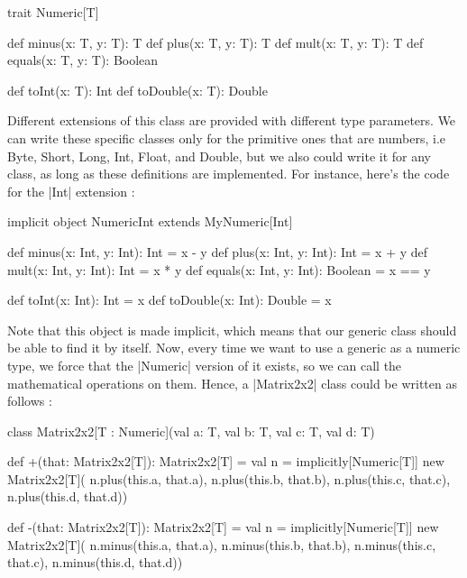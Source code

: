 \begin{lstlisting-nobreak}
 trait Numeric[T] {
   def minus(x: T, y: T): T
   def plus(x: T, y: T): T
   def mult(x: T, y: T): T
   def equals(x: T, y: T): Boolean

   def toInt(x: T): Int
   def toDouble(x: T): Double
 }
\end{lstlisting-nobreak}

Different extensions of this class are provided with different type parameters. We can write these specific classes only for the primitive ones that are numbers, i.e Byte, Short, Long, Int, Float, and Double, but we also could write it for any class, as long as these definitions are implemented. For instance, here's the code for the |Int| extension :

\begin{lstlisting-nobreak}
 implicit object NumericInt extends MyNumeric[Int] {
   def minus(x: Int, y: Int): Int = x - y
   def plus(x: Int, y: Int): Int = x + y
   def mult(x: Int, y: Int): Int = x * y
   def equals(x: Int, y: Int): Boolean = x == y

   def toInt(x: Int): Int = x
   def toDouble(x: Int): Double = x
 }
\end{lstlisting-nobreak}

Note that this object is made implicit, which means that our generic class should be able to find it by itself. Now, every time we want to use a generic as a numeric type, we force that the |Numeric| version of it exists, so we can call the mathematical operations on them. Hence, a |Matrix2x2| class could be written as follows :

\begin{lstlisting-nobreak}
 class Matrix2x2[T : Numeric](val a: T, val b: T, val c: T, val d: T) {

   def +(that: Matrix2x2[T]): Matrix2x2[T] = {
     val n = implicitly[Numeric[T]]
     new Matrix2x2[T](
       n.plus(this.a, that.a),
       n.plus(this.b, that.b),
       n.plus(this.c, that.c),
       n.plus(this.d, that.d))
   }

   def -(that: Matrix2x2[T]): Matrix2x2[T] = {
     val n = implicitly[Numeric[T]]
     new Matrix2x2[T](
       n.minus(this.a, that.a),
       n.minus(this.b, that.b),
       n.minus(this.c, that.c),
       n.minus(this.d, that.d))
   }
 }
\end{lstlisting-nobreak}
%

